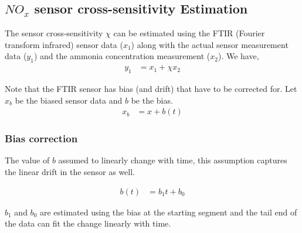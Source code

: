 \subsection{$NO_x$ sensor cross-sensitivity Estimation}

The sensor cross-sensitivity $\chi$ can be estimated using the FTIR (Fourier
transform infrared) sensor data ($x_1$) along with the actual sensor measurement
data ($y_1$) and the ammonia concentration measurement ($x_2$). We have,
\begin{align*}
    y_1 &= x_1 + \chi x_2
\end{align*}

Note that the FTIR sensor has bias (and drift) that have to be corrected for.
Let $x_b$ be the biased sensor data and $b$ be the bias.
\begin{align*}
    x_b &= x + b(t)
\end{align*}

\subsubsection{Bias correction}
The value of $b$ assumed to linearly change with time, this assumption captures
the linear drift in the sensor as well.

\begin{align*}
    b(t) &= b_1 t + b_0
\end{align*}

$b_1$ and $b_0$ are estimated using the bias at the starting segment and the
tail end of the data can fit the change linearly with time.

